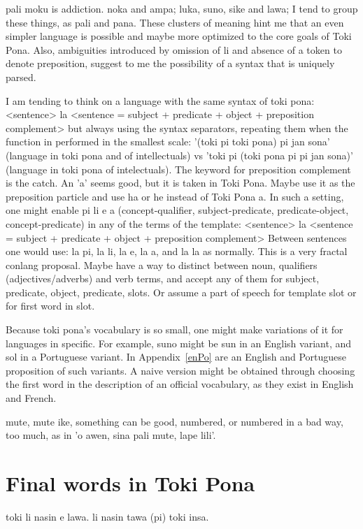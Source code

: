 \documentclass{article}
\begin{document}
pali moku is addiction.
noka and ampa; luka, suno, sike and lawa;
I tend to group these things, as pali and pana.
These clusters of meaning hint me that an even simpler
language is possible and maybe more optimized to the
core goals of Toki Pona.
Also, ambiguities introduced by omission of li
and absence of a token to denote preposition,
suggest to me the possibility of a syntax that is uniquely
parsed.

I am tending to think on a language with the same syntax of toki pona:
<sentence> la <sentence = subject + predicate + object + preposition complement>
but always using the syntax separators,
repeating them when the function in performed in the smallest scale:
'(toki pi toki pona) pi jan sona' (language in toki pona and of intellectuals) vs
'toki pi (toki pona pi pi jan sona)' (language in toki pona of intelectuals).
The keyword for preposition complement is the catch.
An 'a' seems good, but it is taken in Toki Pona.
Maybe use it as the preposition particle and use ha or he
instead of Toki Pona a.
In such a setting,
one might enable pi li e a (concept-qualifier, subject-predicate,
predicate-object, concept-predicate)
in any of the terms of the template:
<sentence> la <sentence = subject + predicate + object + preposition complement>
Between sentences one would use:
la pi, la li, la e, la a, and la la as normally.
This is a very fractal conlang proposal.
Maybe have a way to distinct between noun, qualifiers (adjectives/adverbs) and verb terms,
and accept any of them for subject, predicate, object, predicate,
slots. Or assume a part of speech for template slot or for first word in slot.

Because toki pona's vocabulary is so small,
one might make variations of it for languages
in specific.
For example,
suno might be sun in an English variant,
and sol in a Portuguese variant.
In Appendix~\ref{enPo} are an English and Portuguese
proposition of such variants.
A naive version might be obtained through
choosing the first word in the description of
an official vocabulary, as they exist in English and French.



mute, mute ike,
something can be good, numbered,
or numbered in a bad way, too much,
as in 'o awen, sina pali mute, lape lili'.




% 


\section{Final words in Toki Pona}\label{ftp}
toki li nasin e lawa.
li nasin tawa (pi) toki insa.
\end{document}
